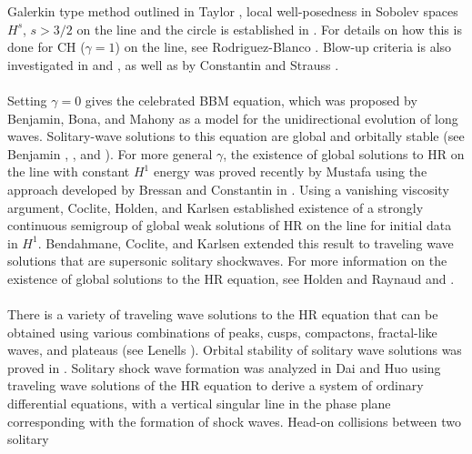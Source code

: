\documentclass[12pt,reqno]{amsart}
\numberwithin{equation}{section}  %
\numberwithin{figure}{section}
\begin{document}
Galerkin type method outlined in Taylor \cite{Taylor_1991_Pseudodifferent}, local
well-posedness in Sobolev spaces $H^s$,  $s > 3/2$ on the line and the circle is
established in \cite{Karapetyan:2010fk}. 
For details on how this is done for CH ($\gamma =1$) on the line, see Rodriguez-Blanco 
\cite{Rodriguez-Blanco_2001_On-the-Cauchy-p}. Blow-up criteria 
is also investigated in \cite{Yin_2003_On-the-Cauchy-p} and 
\cite{Zhou_2005_Local-well-pose}, as well as by Constantin and Strauss 
\cite{Constantin_2000_Stability-of-a-}. 
\\
\\
Setting $\gamma = 0$ gives the celebrated 
BBM equation, which was proposed by 
Benjamin, Bona, and Mahony 
\cite{Benjamin_1972_Model-equations} as a model for 
the unidirectional evolution of long waves.
Solitary-wave solutions to this 
equation are global and orbitally stable (see Benjamin 
\cite{Benjamin_1972_The-stability-o}, 
\cite{Benjamin_1972_Model-equations}, and 
\cite{Constantin_2000_Stability-of-a-}).
For more general $\gamma$, the existence of global 
solutions to HR on the line with constant $H^1$ energy
was proved recently by Mustafa \cite{Mustafa_2007_Global-conserva}
using the approach developed by Bressan and 
Constantin in \cite{Bressan_2007_Global-conserva}. Using a vanishing 
viscosity argument, Coclite, 
Holden, and Karlsen \cite{Coclite_2005_Global-weak-sol}
established existence of a strongly continuous semigroup of global 
weak solutions of HR on the line for initial data in $H^1$.
Bendahmane, Coclite, and Karlsen 
\cite{Bendahmane_2006_Hsp-1-perturbat} extended this result to traveling 
wave solutions that are supersonic solitary shockwaves.
For more information on the existence of global solutions to the HR
equation, see Holden and Raynaud \cite{Holden_2007_Global-conserva}
and \cite{Yin_2003_On-the-Cauchy-p}. 
\\
\\
There is a variety of traveling wave solutions to the HR equation that can be 
obtained using various combinations of peaks, cusps, compactons, 
fractal-like waves, and plateaus (see Lenells 
\cite{Lenells_2006_Traveling-waves}). Orbital stability of solitary wave 
solutions was proved in \cite{Constantin_2000_Stability-of-a-}.
Solitary shock wave formation was 
analyzed in Dai and Huo \cite{Dai_2000_Solitary-shock-} using traveling 
wave solutions of the HR equation to derive a system of ordinary differential 
equations, with a vertical singular line in the phase plane corresponding with the 
formation of shock waves. Head-on collisions between two solitary 
\end{document}
